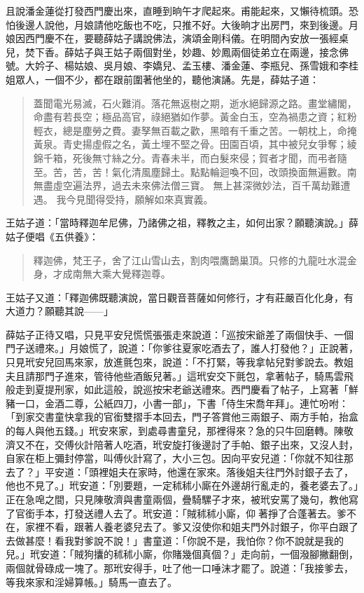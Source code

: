 且說潘金蓮從打發西門慶出來，直睡到晌午才爬起來。甫能起來，又懶待梳頭。恐怕後邊人說他，月娘請他吃飯也不吃，只推不好。大後晌才出房門，來到後邊。月娘因西門慶不在，要聽薛姑子講說佛法，演頌金剛科儀。在明間內安放一張經桌兒，焚下香。薛姑子與王姑子兩個對坐，妙趣、妙鳳兩個徒弟立在兩邊，接念佛號。大妗子、楊姑娘、吳月娘、李嬌兒、孟玉樓、潘金蓮、李瓶兒、孫雪娥和李桂姐眾人，一個不少，都在跟前圍著他坐的，聽他演誦。先是，薛姑子道：
\begin{quote}
蓋聞電光易滅，石火難消。落花無返樹之期，逝水絕歸源之路。畫堂繡閣，命盡有若長空；極品高官，祿絕猶如作夢。黃金白玉，空為禍患之資；紅粉輕衣，總是塵勞之費。妻孥無百載之歡，黑暗有千重之苦。一朝枕上，命掩黃泉。青史揚虛假之名，黃土埋不堅之骨。田園百頃，其中被兒女爭奪；綾錦千箱，死後無寸絲之分。青春未半，而白髮來侵；賀者才聞，而弔者隨至。苦，苦，苦！氣化清風塵歸土。點點輪迴喚不回，改頭換面無遍數。南無盡虛空遍法界，過去未來佛法僧三寶。
無上甚深微妙法，百千萬劫難遭遇。
我今見聞得受持，願解如來真實義。
\end{quote}

王姑子道：「當時釋迦牟尼佛，乃諸佛之祖，釋教之主，如何出家？願聽演說。」薛姑子便唱《五供養》：
\begin{quote}
釋迦佛，梵王子，舍了江山雪山去，割肉喂鷹鵲巢頂。只修的九龍吐水混金身，才成南無大乘大覺釋迦尊。
\end{quote}

王姑子又道：「釋迦佛既聽演說，當日觀音菩薩如何修行，才有莊嚴百化化身，有大道力？願聽其說——」

薛姑子正待又唱，只見平安兒慌慌張張走來說道：「巡按宋爺差了兩個快手、一個門子送禮來。」月娘慌了，說道：「你爹往夏家吃酒去了，誰人打發他？」正說著，只見玳安兒回馬來家，放進氈包來，說道：「不打緊，等我拿帖兒對爹說去。教姐夫且請那門子進來，管待他些酒飯兒著。」這玳安交下氈包，拿著帖子，騎馬雲飛般走到夏提刑家，如此這般，說巡按宋老爺送禮來。西門慶看了帖子，上寫著「鮮豬一口，金酒二尊，公紙四刀，小書一部」，下書「侍生宋喬年拜」。連忙吩咐：「到家交書童快拿我的官銜雙摺手本回去，門子答賞他三兩銀子、兩方手帕，抬盒的每人與他五錢。」玳安來家，到處尋書童兒，那裡得來？急的只牛回磨轉。陳敬濟又不在，交傅伙計陪著人吃酒，玳安旋打後邊討了手帕、銀子出來，又沒人封，自家在柜上彌封停當，叫傅伙計寫了，大小三包。因向平安兒道：「你就不知往那去了？」平安道：「頭裡姐夫在家時，他還在家來。落後姐夫往門外討銀子去了，他也不見了。」玳安道：「別要題，一定秫秫小廝在外邊胡行亂走的，養老婆去了。」正在急唣之間，只見陳敬濟與書童兩個，疊騎騾子才來，被玳安罵了幾句，教他寫了官銜手本，打發送禮人去了。玳安道：「賊秫秫小廝，仰𢵞著掙了合蓬著去。爹不在，家裡不看，跟著人養老婆兒去了。爹又沒使你和姐夫門外討銀子，你平白跟了去做甚麼！看我對爹說不說！」書童道：「你說不是，我怕你？你不說就是我的兒。」玳安道：「賊狗攮的秫秫小廝，你賭幾個真個？」走向前，一個潑腳撇翻倒，兩個就骨碌成一塊了。那玳安得手，吐了他一口唾沫才罷了。說道：「我接爹去，等我來家和淫婦算帳。」騎馬一直去了。

